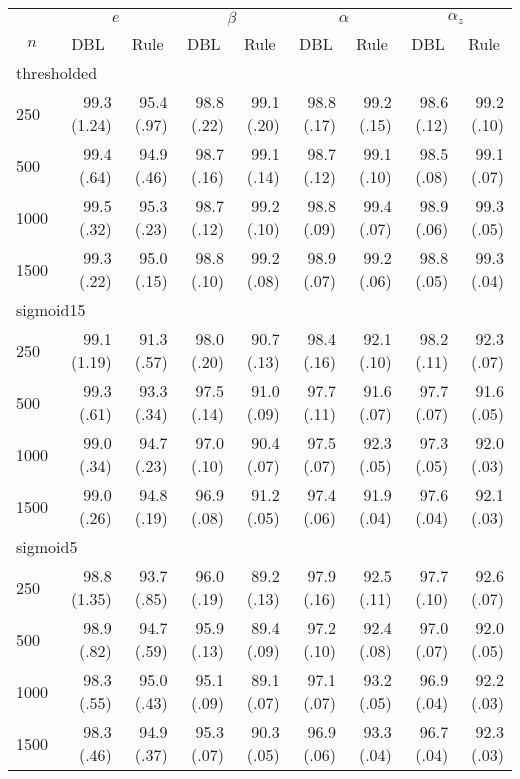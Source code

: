 \begin{tabular}{lrrrrrrrr}
   \hline
 
       &  \multicolumn{2}{c}{$e$}    & \multicolumn{2}{c}{$\beta$}  & \multicolumn{2}{c}{$\alpha$}  & \multicolumn{2}{c}{$\alpha_z$} \\ 
         \multicolumn{1}{c}{$n$} & \multicolumn{1}{c}{DBL}& \multicolumn{1}{c}{Rule}& \multicolumn{1}{c}{DBL}& \multicolumn{1}{c}{Rule}& \multicolumn{1}{c}{DBL}& \multicolumn{1}{c}{Rule}& \multicolumn{1}{c}{DBL}& \multicolumn{1}{c}{Rule} \\ \hline
            
 \multicolumn{9}{l}{thresholded} \\ 
250 & 99.3 (1.24) & 95.4 (.97) & 98.8 (.22) & 99.1 (.20) & 98.8 (.17) & 99.2 (.15) & 98.6 (.12) & 99.2 (.10) \\ 
  500 & 99.4 (.64) & 94.9 (.46) & 98.7 (.16) & 99.1 (.14) & 98.7 (.12) & 99.1 (.10) & 98.5 (.08) & 99.1 (.07) \\ 
  1000 & 99.5 (.32) & 95.3 (.23) & 98.7 (.12) & 99.2 (.10) & 98.8 (.09) & 99.4 (.07) & 98.9 (.06) & 99.3 (.05) \\ 
  1500 & 99.3 (.22) & 95.0 (.15) & 98.8 (.10) & 99.2 (.08) & 98.9 (.07) & 99.2 (.06) & 98.8 (.05) & 99.3 (.04) \\ 
          
 \multicolumn{9}{l}{sigmoid15} \\ 
250 & 99.1 (1.19) & 91.3 (.57) & 98.0 (.20) & 90.7 (.13) & 98.4 (.16) & 92.1 (.10) & 98.2 (.11) & 92.3 (.07) \\ 
  500 & 99.3 (.61) & 93.3 (.34) & 97.5 (.14) & 91.0 (.09) & 97.7 (.11) & 91.6 (.07) & 97.7 (.07) & 91.6 (.05) \\ 
  1000 & 99.0 (.34) & 94.7 (.23) & 97.0 (.10) & 90.4 (.07) & 97.5 (.07) & 92.3 (.05) & 97.3 (.05) & 92.0 (.03) \\ 
  1500 & 99.0 (.26) & 94.8 (.19) & 96.9 (.08) & 91.2 (.05) & 97.4 (.06) & 91.9 (.04) & 97.6 (.04) & 92.1 (.03) \\ 
          
 \multicolumn{9}{l}{sigmoid5} \\ 
250 & 98.8 (1.35) & 93.7 (.85) & 96.0 (.19) & 89.2 (.13) & 97.9 (.16) & 92.5 (.11) & 97.7 (.10) & 92.6 (.07) \\ 
  500 & 98.9 (.82) & 94.7 (.59) & 95.9 (.13) & 89.4 (.09) & 97.2 (.10) & 92.4 (.08) & 97.0 (.07) & 92.0 (.05) \\ 
  1000 & 98.3 (.55) & 95.0 (.43) & 95.1 (.09) & 89.1 (.07) & 97.1 (.07) & 93.2 (.05) & 96.9 (.04) & 92.2 (.03) \\ 
  1500 & 98.3 (.46) & 94.9 (.37) & 95.3 (.07) & 90.3 (.05) & 96.9 (.06) & 93.3 (.04) & 96.7 (.04) & 92.3 (.03) \\ 
          

\end{tabular}
